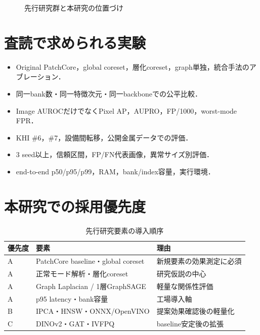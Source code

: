 \documentclass[a4paper,11pt]{ltjsarticle}
\begin{document}
\begin{figure}[H]
\centering
{}
\caption{先行研究群と本研究の位置づけ}
\end{figure}

\section{査読で求められる実験}
\begin{itemize}
  \item Original PatchCore，global coreset，層化coreset，graph単独，統合手法のアブレーション．
  \item 同一bank数・同一特徴次元・同一backboneでの公平比較．
  \item Image AUROCだけでなくPixel AP，AUPRO，FP/1000，worst-mode FPR．
  \item KHI \#6，\#7，設備間転移，公開金属データでの評価．
  \item 3 seed以上，信頼区間，FP/FN代表画像，異常サイズ別評価．
  \item end-to-end p50/p95/p99，RAM，bank/index容量，実行環境．
\end{itemize}

\section{本研究での採用優先度}
\begin{table}[H]
\centering
\caption{先行研究要素の導入順序}
\begin{tabularx}{\linewidth}{C{15mm}L{37mm}Y}
\toprule
優先度 & 要素 & 理由 \\
\midrule
A & PatchCore baseline・global coreset & 新規要素の効果測定に必須 \\
A & 正常モード解析・層化coreset & 研究仮説の中心 \\
A & Graph Laplacian / 1層GraphSAGE & 軽量な関係性評価 \\
A & p95 latency・bank容量 & 工場導入軸 \\
B & IPCA・HNSW・ONNX/OpenVINO & 提案効果確認後の軽量化 \\
C & DINOv2・GAT・IVFPQ & baseline安定後の拡張 \\
\bottomrule
\end{tabularx}
\end{table}
\end{document}
